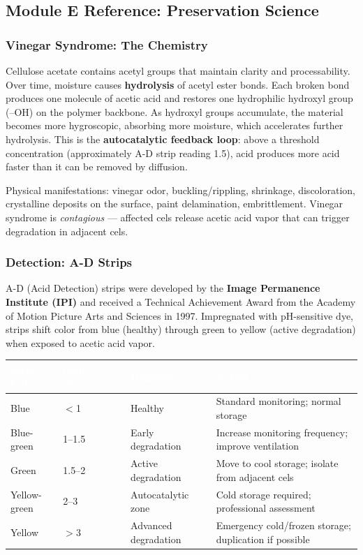 \documentclass[11pt,letterpaper]{article}
\newcommand{\tableheader}[1]{\textbf{\sffamily\textcolor{white}{#1}}}
\begin{document}
\subsection{Module E Reference: Preservation Science}

\subsubsection{Vinegar Syndrome: The Chemistry}

Cellulose acetate contains acetyl groups that maintain clarity and processability. Over time, moisture causes \textbf{hydrolysis} of acetyl ester bonds. Each broken bond produces one molecule of acetic acid and restores one hydrophilic hydroxyl group (--OH) on the polymer backbone. As hydroxyl groups accumulate, the material becomes more hygroscopic, absorbing more moisture, which accelerates further hydrolysis. This is the \textbf{autocatalytic feedback loop}: above a threshold concentration (approximately A-D strip reading 1.5), acid produces more acid faster than it can be removed by diffusion.

Physical manifestations: vinegar odor, buckling/rippling, shrinkage, discoloration, crystalline deposits on the surface, paint delamination, embrittlement. Vinegar syndrome is \textit{contagious} --- affected cels release acetic acid vapor that can trigger degradation in adjacent cels.

\subsubsection{Detection: A-D Strips}

A-D (Acid Detection) strips were developed by the \textbf{Image Permanence Institute (IPI)} and received a Technical Achievement Award from the Academy of Motion Picture Arts and Sciences in 1997. Impregnated with pH-sensitive dye, strips shift color from blue (healthy) through green to yellow (active degradation) when exposed to acetic acid vapor.

\begin{center}
\begin{tabularx}{\textwidth}{C{2cm}C{2cm}L{3cm}X}
\toprule
{}
\tableheader{Strip Color} & \tableheader{ppm (approx.)} & \tableheader{Diagnosis} & \tableheader{Action} \\
\midrule
Blue & $<$1 & Healthy & Standard monitoring; normal storage \\
Blue-green & 1--1.5 & Early degradation & Increase monitoring frequency; improve ventilation \\
Green & 1.5--2 & Active degradation & Move to cool storage; isolate from adjacent cels \\
Yellow-green & 2--3 & Autocatalytic zone & Cold storage required; professional assessment \\
Yellow & $>$3 & Advanced degradation & Emergency cold/frozen storage; duplication if possible \\
\bottomrule
\end{tabularx}
\end{center}
\end{document}
